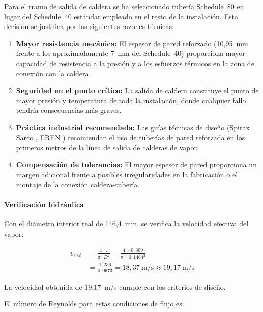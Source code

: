 \documentclass[12pt]{article}
\begin{document}
Para el tramo de salida de caldera se ha seleccionado tubería Schedule~80 en lugar del Schedule~40 estándar empleado en el resto de la instalación. Esta decisión se justifica por las siguientes razones técnicas:

\begin{enumerate}[label=\arabic*., leftmargin=2em]
	\item \textbf{Mayor resistencia mecánica:} El espesor de pared reforzado (10,95~mm frente a los aproximadamente 7~mm del Schedule~40) proporciona mayor capacidad de resistencia a la presión y a los esfuerzos térmicos en la zona de conexión con la caldera.
	\item \textbf{Seguridad en el punto crítico:} La salida de caldera constituye el punto de mayor presión y temperatura de toda la instalación, donde cualquier fallo tendría consecuencias más graves.
	\item \textbf{Práctica industrial recomendada:} Las guías técnicas de diseño (Spirax Sarco \cite{SpiraxSarco2020}, EREN \cite{EREN2015}) recomiendan el uso de tuberías de pared reforzada en los primeros metros de la línea de salida de calderas de vapor.
	\item \textbf{Compensación de tolerancias:} El mayor espesor de pared proporciona un margen adicional frente a posibles irregularidades en la fabricación o el montaje de la conexión caldera-tubería.
\end{enumerate}

\paragraph{Verificación hidráulica}

Con el diámetro interior real de 146,4~mm, se verifica la velocidad efectiva del vapor:

\begin{equation}
	\begin{split}
		v_{\text{real}} & = \frac{4 \cdot \dot{V}}{\pi \cdot D^2} = \frac{4 \times 0{,}309}{\pi \times 0{,}1464^2} \\
		                & = \frac{1{,}236}{0{,}0673} = 18{,}37 \ \text{m/s} \approx 19{,}17 \ \text{m/s}
	\end{split}
	\label{eq:velocidad-real-tramo1}
\end{equation}

La velocidad obtenida de 19,17~m/s cumple con los criterios de diseño.

El número de Reynolds para estas condiciones de flujo es:
\end{document}
